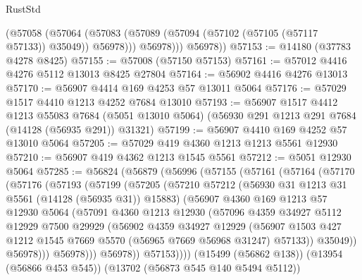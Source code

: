 \begin{lexlean}{RustStd}
\begin{coremodule}
            (@57058
              (@57064 (@57083 (@57089 (@57094 (@57102 (@57105 (@57117 @57133)) @35049)) @56978)))
              @56978)))
        @56978))
@57153 := @14180 (@37783 @4278 @8425)
@57155 := @57008 (@57150 @57153)
@57161 := @57012 @4416 @4276 @5112 @13013 @8425 @27804
@57164 := @56902 @4416 @4276 @13013
@57170 := @56907 @4414 @169 @4253 @57 @13011 @5064
@57176 := @57029 @1517 @4410 @1213 @4252 @7684 @13010
@57193 := @56907
    @1517
    @4412
    @1213
    @55083
    @7684
    (@5051 @13010 @5064)
    (@56930 @291 @1213 @291 @7684 (@14128 (@56935 @291)) @31321)
@57199 := @56907 @4410 @169 @4252 @57 @13010 @5064
@57205 := @57029 @419 @4360 @1213 @1213 @5561 @12930
@57210 := @56907 @419 @4362 @1213 @1545 @5561
@57212 := @5051 @12930 @5064
@57285 := @56824
    (@56879
      (@56996
        (@57155
          (@57161
            (@57164
              (@57170
                (@57176
                  (@57193
                    (@57199
                      (@57205
                        (@57210
                          @57212
                          (@56930 @31 @1213 @31 @5561 (@14128 (@56935 @31)) @15883)
                          (@56907
                            @4360
                            @169
                            @1213
                            @57
                            @12930
                            @5064
                            (@57091
                              @4360
                              @1213
                              @12930
                              (@57096
                                @4359
                                @34927
                                @5112
                                @12929
                                @7500
                                @29929
                                (@56902
                                  @4359
                                  @34927
                                  @12929
                                  (@56907
                                    @1503
                                    @427
                                    @1212
                                    @1545
                                    @7669
                                    @5570
                                    (@56965 @7669 @56968 @31247)
                                    @57133))
                                @35049))
                            @56978)))
                      @56978)))
                @56978))
            @57153))))
    (@15499 (@56862 @138))
    (@13954 (@56866 @453 @545))
    (@13702 (@56873 @545 @140 @5494 @5112))

\end{coremodule}
\end{lexlean}
